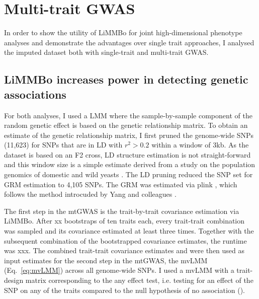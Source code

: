 \newpage
\section{Multi-trait GWAS}
In order to show the utility of LiMMBo for joint high-dimensional phenotype analyses and demonstrate the advantages over single trait approaches, I analysed the imputed dataset both with single-trait and multi-trait GWAS.  

\subsection{LiMMBo increases power in detecting genetic associations}
For both analyses, I used a LMM where the sample-by-sample component of the random genetic effect is based on the genetic relationship matrix. To obtain an estimate of the genetic relationship matrix, I first pruned the genome-wide SNPs (11,623) for SNPs that are in LD with \(r^2 > 0.2\) within a window of 3kb. As the dataset is based on an F2 cross, LD structure estimation is not straight-forward and this window size is a simple estimate derived from a study on the population genomics of domestic and wild yeasts \citep{Liti2009}. The LD pruning reduced the SNP set for GRM estimation to 4,105 SNPs. The GRM was estimated via plink \cite{Chang2015}, which follows the method introcuded by Yang and colleagues \citep{Yang2011}. 

The first step in the mtGWAS is the trait-by-trait covariance estimation via LiMMBo. After xx bootstraps of ten traits each, every trait-trait combination was sampled and its covariance estimated at least three times. Together with the subsequent combination of the bootstrapped covariance estimates, the runtime was xxx. The combined trait-trait covariance estimates  and  were then used as input estimates for the second step in the mtGWAS, the mvLMM  (Eq.~\ref{eq:mvLMM}) across all genome-wide SNPs.  I used a mvLMM with a trait-design matrix corresponding to the any effect test, i.e. testing for an effect of the SNP on any of the traits compared to the null hypothesis of no association ().

